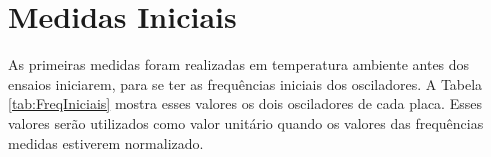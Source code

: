 \section{Medidas Iniciais}
\label{sec:ResMedidasIniciais}

As primeiras medidas foram realizadas em temperatura ambiente antes dos ensaios iniciarem, para se ter as frequências iniciais dos osciladores. A Tabela \ref{tab:FreqIniciais} mostra esses valores os dois osciladores de cada placa. Esses valores serão utilizados como valor unitário quando os valores das frequências medidas estiverem normalizado.

